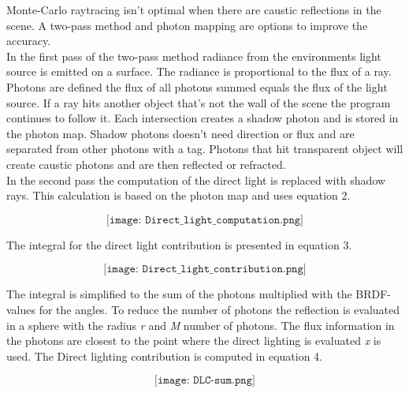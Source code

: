 \documentclass[a4paper,12pt,oneside,final]{report}
\begin{document}
Monte-Carlo raytracing isn't optimal when there are caustic reflections in the scene. A two-pass method and photon mapping are options to improve the accuracy. 
\\In the first pass of the two-pass method radiance from the environments light source is emitted on a surface. The radiance is proportional to the flux of a ray. Photons are defined the flux of all photons summed equals the flux of the light source.
If a ray hits another object that's not the wall of the scene the program continues to follow it. Each intersection creates a shadow photon and is stored in the photon map. Shadow photons doesn't need direction or flux and are separated from other photons with a tag.
Photons that hit transparent object will create caustic photons and are then reflected or refracted. 
\\In the second pass the computation of the direct light is replaced with shadow rays. This calculation is based on the photon map and uses equation 2.
\begin{center}
\begin{equation} \label{eq:solve}
\texttt{[image: Direct\_light\_computation.png]}
\end{equation}
\end{center}
The integral for the direct light contribution is presented in equation 3.
\begin{center}
\begin{equation} \label{eq:solve}
\texttt{[image: Direct\_light\_contribution.png]}
\end{equation}
\end{center}
The integral is simplified to the sum of the photons multiplied with the BRDF-values for the angles. To reduce the number of photons the reflection is evaluated in a sphere with the radius \textit{r} and \textit{M} number of photons. The flux information in the photons are closest to the point where the direct lighting is evaluated \textit{x} is used. The Direct lighting contribution is computed in equation 4.
\begin{center}
\begin{equation} \label{eq:solve}
\texttt{[image: DLC-sum.png]}
\end{equation}
\end{center}
\end{document}
